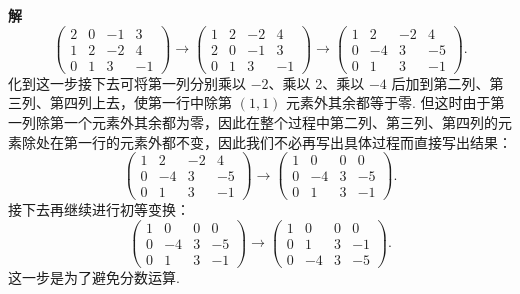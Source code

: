 \documentclass[UTF8, 12pt, fontset=fandol, oneside]{ctexart}
\begin{document}
\noindent\textbf{解}\quad
\[
\left(\begin{array}{cccc}
2 & 0 & -1 & 3\\
1 & 2 & -2 & 4\\
0 & 1 & 3 & -1
\end{array}\right)
\longrightarrow
\left(\begin{array}{cccc}
1 & 2 & -2 & 4\\
2 & 0 & -1 & 3\\
0 & 1 & 3 & -1
\end{array}\right)
\longrightarrow
\left(\begin{array}{cccc}
1 & 2 & -2 & 4\\
0 & -4 & 3 & -5\\
0 & 1 & 3 & -1
\end{array}\right).
\]
化到这一步接下去可将第一列分别乘以 $-2$、乘以 2、乘以 $-4$ 后加到第二列、第三列、第四列上去，使第一行中除第 $(1,1)$ 元素外其余都等于零. 但这时由于第一列除第一个元素外其余都为零，因此在整个过程中第二列、第三列、第四列的元素除处在第一行的元素外都不变，因此我们不必再写出具体过程而直接写出结果：
\[
\left(\begin{array}{cccc}
1 & 2 & -2 & 4\\
0 & -4 & 3 & -5\\
0 & 1 & 3 & -1
\end{array}\right)
\longrightarrow
\left(\begin{array}{cccc}
1 & 0 & 0 & 0\\
0 & -4 & 3 & -5\\
0 & 1 & 3 & -1
\end{array}\right).
\]
接下去再继续进行初等变换：
\[
\left(\begin{array}{cccc}
1 & 0 & 0 & 0\\
0 & -4 & 3 & -5\\
0 & 1 & 3 & -1
\end{array}\right)
\longrightarrow
\left(\begin{array}{cccc}
1 & 0 & 0 & 0\\
0 & 1 & 3 & -1\\
0 & -4 & 3 & -5
\end{array}\right).
\]
这一步是为了避免分数运算.
\end{document}
